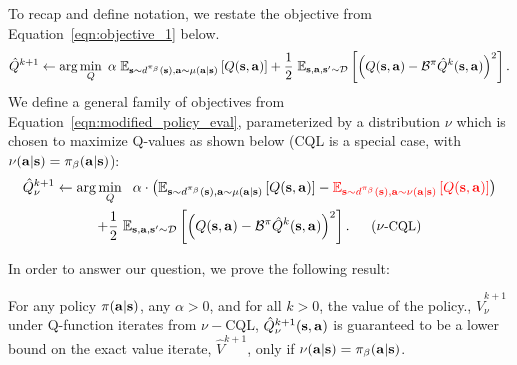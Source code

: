To recap and define notation, we restate the objective from Equation~\ref{eqn:objective_1} below.  
\begin{equation}
    \small{\hat{Q}^{k+1} \leftarrow \arg\min_{Q}~ \alpha~ \mathbb{E}_{\mathbf{s}\sim d^{\pi_\beta}(\mathbf{s}), \mathbf{a}\sim \mu(\mathbf{a}|\mathbf{s})}\left[Q(\mathbf{s}, \mathbf{a})\right] + \frac{1}{2}~ \mathbb{E}_{\mathbf{s}, \mathbf{a}, \mathbf{s}' \sim \mathcal{D}}\left[\left(Q(\mathbf{s}, \mathbf{a}) - \mathcal{B}^\pi\hat{Q}^{k} (\mathbf{s}, \mathbf{a}) \right)^2 \right].} 
    \label{eqn:objective_1_restated}
\end{equation}
We define a general family of objectives from Equation~\ref{eqn:modified_policy_eval}, parameterized by a distribution $\nu$ which is chosen to maximize Q-values as shown below (CQL is a special case, with $\nu(\mathbf{a}|\mathbf{s}) = {\pi_\beta}(\mathbf{a}|\mathbf{s})$):
\begin{multline}
    \small{\hat{Q}^{k+1}_\nu \leftarrow \arg\min_{Q}~~ \alpha \cdot \left(\mathbb{E}_{\mathbf{s}\sim d^{\pi_\beta}(\mathbf{s}), \mathbf{a}\sim \mu(\mathbf{a}|\mathbf{s})}\left[Q(\mathbf{s}, \mathbf{a})\right] - \textcolor{red}{\mathbb{E}_{\mathbf{s}\sim d^{\pi_\beta}(\mathbf{s}), \mathbf{a}\sim \nu(\mathbf{a}|\mathbf{s})}\left[Q(\mathbf{s}, \mathbf{a})\right]} \right)} \\
    \small{+ \frac{1}{2}~ \mathbb{E}_{\mathbf{s}, \mathbf{a}, \mathbf{s}' \sim \mathcal{D}}\left[\left(Q(\mathbf{s}, \mathbf{a}) - \mathcal{B}^\pi\hat{Q}^{k} (\mathbf{s}, \mathbf{a}) \right)^2 \right].~~~~~ (\nu\text{-CQL})}
    \label{eqn:modified_policy_eval_new}
\end{multline}

In order to answer our question, we prove the following result:
\begin{theorem} For any policy $\pi(\mathbf{a}|\mathbf{s})$, any $\alpha > 0$, and for all $k > 0$, the value of the policy., $\hat{V}^{k+1}_\nu$ under Q-function iterates from $\nu-$CQL, $\hat{Q}^{k+1}_\nu(\mathbf{s}, \mathbf{a})$ is guaranteed to be a lower bound on the exact value iterate, $\hat{V}^{k+1}$, only if $\nu(\mathbf{a}|\mathbf{s}) = {\pi_\beta}(\mathbf{a}|\mathbf{s})$.   
\end{theorem}

